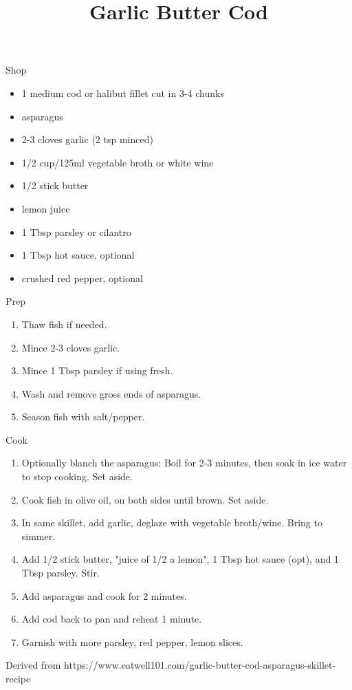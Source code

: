 \documentclass{article}
\title{Garlic Butter Cod}
\date{\vspace{-5ex}}
\begin{document}
\maketitle

Shop

\begin{itemize}
	\item 1 medium cod or halibut fillet cut in 3-4 chunks
	\item asparagus
	\item 2-3 cloves garlic (2 tsp minced)
	\item 1/2 cup/125ml vegetable broth or white wine
	\item 1/2 stick butter
	\item lemon juice
	\item 1 Tbsp parsley or cilantro
	\item 1 Tbsp hot sauce, optional
	\item crushed red pepper, optional
\end{itemize}

Prep

\begin{enumerate}
	\item Thaw fish if needed.
	\item Mince 2-3 cloves garlic.
	\item Mince 1 Tbsp parsley if using fresh.
	\item Wash and remove gross ends of asparagus.
	\item Season fish with salt/pepper.
\end{enumerate}

Cook

\begin{enumerate}
	\item Optionally blanch the asparagus: Boil for 2-3 minutes, then soak in ice water to stop cooking. Set aside.
	\item Cook fish in olive oil, on both sides until brown. Set aside.
	\item In same skillet, add garlic, deglaze with vegetable broth/wine. Bring to simmer.
	\item Add 1/2 stick butter, "juice of 1/2 a lemon", 1 Tbsp hot sauce (opt), and 1 Tbsp parsley. Stir.
	\item Add asparagus and cook for 2 minutes.
	\item Add cod back to pan and reheat 1 minute.
	\item Garnish with more parsley, red pepper, lemon slices.
\end{enumerate}

Derived from https://www.eatwell101.com/garlic-butter-cod-asparagus-skillet-recipe
\end{document}
